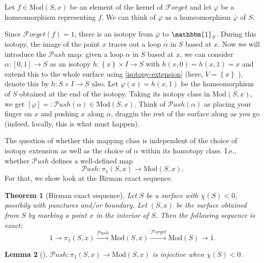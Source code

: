 \documentclass[reqno]{amsart}
\newtheorem{theorem}{Theorem}[section]
\newtheorem{lemma}[theorem]{Lemma}
\theoremstyle{definition}
\theoremstyle{remark}
\newcommand{\Mod}{{\mathrm{Mod}}}
\newcommand{\Push}{{\mathcal{P}}ush}
\newcommand{\Forget}{{\mathcal{F}}orget}
\begin{document}
 Let $f \in \Mod(S,x)$ be an element of the kernel
 of $\Forget$ and let  $\varphi $ be a homeomorphism
 representing $f$. We can think of
 $\varphi $ as a homeomorphism $\overline{\varphi}$ of
 $S$.

 Since $\Forget (f) = 1$, there is an isotopy
 from $\overline{\varphi }$ to $\mathbbm{1}_S$. During
 this isotopy, the image of the point $x$ traces out a
 loop $\alpha$ in $S$ based at $x$. Now
 we will introduce the $\Push$ map:
 given a loop $\alpha$ in $S$ based at $x$, we can
 consider $\alpha \colon \left[ 0,1 \right] \to S$ as
 an isotopy $h \colon \left\{ x \right\} \times I
 \to S$ with $h(x,0) = h(x,1) = x$ and extend this
 to the whole surface using \ref{isotopy-extension} (here,
 $V = \left\{ x \right\} $ ), denote this by
 $h \colon S \times I \to S$ also. Let
 $\varphi (x) = h(x,1) $ be the homeomorphism
 of $S$ obtained at the end of the isotopy. Taking its
 isotopy class in $\Mod \left( S,x \right) $, we get
 $\left[ \varphi  \right] = : 
 \Push(\alpha) \in \Mod\left( S,x \right) $.
 Think of $\Push(\alpha)$ as placing your finger on
 $x$ and pushing $x$ along $\alpha$, draggin the
 rest of the surface along as you go (indeed, locally,
 this is what must happen).

 The question of whether this mapping class
 is independent of the choice of isotopy extension
 as well as the choice of $\alpha$ within its homotopy class.
 I.e., whether $\Push$ defines a 
 well-defined map
 \[
 \Push \colon \pi_1 \left( S,x \right) 
 \to \Mod \left( S,x \right) .
 \] 
 For that, we show look at the
 Birman exact sequence.






 \begin{theorem}[Birman exact sequence]
     Let $S$ be a surface with $\chi (S) < 0$, possibily
     with punctures and/or boundary. Let
     $\left( S, x \right) $ be the surface
     obtained from $S$ by marking a point $x$ in
     the interior of $S$. Then the following
     sequence is exact:
     \[
         1 \to \pi_1 \left( S, x \right) \stackrel{\Push}{\to }
         \Mod \left( S, x \right) 
         \stackrel{\Forget}{\to } \Mod(S) \to 1.
     \] 
 \end{theorem}


 \begin{lemma}[]
     $\Push \colon \pi_1 \left( S,x \right) 
     \to \Mod (S,x)$ is injective when
     $\chi (S) <0$.
 \end{lemma}
\end{document}
